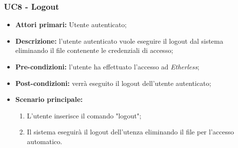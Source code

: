 \subsubsection{UC8 - Logout}
\begin{itemize}
	\item \textbf{Attori primari:} Utente autenticato;
	\item \textbf{Descrizione:} l'utente autenticato vuole eseguire il logout dal sistema eliminando il file contenente le credenziali di accesso; 
	\item \textbf{Pre-condizioni:} l'utente ha effettuato l'accesso ad \textit{Etherless};
	\item \textbf{Post-condizioni:} verrà eseguito il logout dell'utente autenticato;
	\item \textbf{Scenario principale:} 
	\begin{enumerate}
		\item L'utente inserisce il comando "logout";
		\item Il sistema eseguirà il logout dell'utenza eliminando il file per l'accesso automatico.
	\end{enumerate}
\end{itemize}